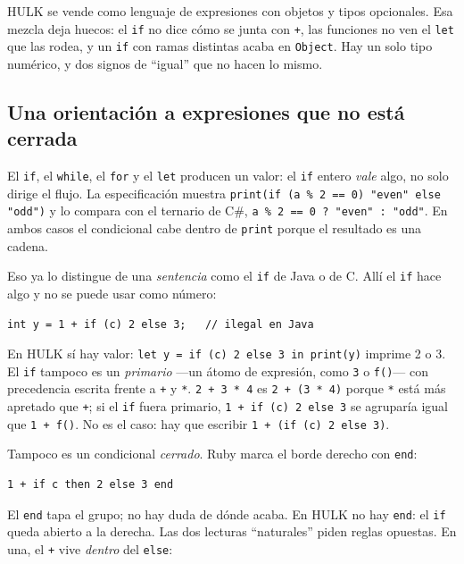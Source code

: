 \documentclass[11pt,a4paper]{article}
\begin{document}
HULK se vende como lenguaje de expresiones con objetos y tipos opcionales. Esa mezcla deja huecos: el \texttt{if} no dice cómo se junta con \texttt{+}, las funciones no ven el \texttt{let} que las rodea, y un \texttt{if} con ramas distintas acaba en \texttt{Object}. Hay un solo tipo numérico, y dos signos de ``igual'' que no hacen lo mismo.

\subsection{Una orientación a expresiones que no está cerrada}

El \texttt{if}, el \texttt{while}, el \texttt{for} y el \texttt{let} producen un valor: el \texttt{if} entero \emph{vale} algo, no solo dirige el flujo. La especificación muestra \texttt{print(if (a \% 2 == 0) "even" else "odd")} y lo compara con el ternario de C\#, \texttt{a \% 2 == 0 ? "even" : "odd"}. En ambos casos el condicional cabe dentro de \texttt{print} porque el resultado es una cadena.

Eso ya lo distingue de una \emph{sentencia} como el \texttt{if} de Java o de C. Allí el \texttt{if} hace algo y no se puede usar como número:

\begin{lstlisting}[language={},numbers=none]
int y = 1 + if (c) 2 else 3;   // ilegal en Java
\end{lstlisting}

En HULK sí hay valor: \texttt{let y = if (c) 2 else 3 in print(y)} imprime 2 o 3. El \texttt{if} tampoco es un \emph{primario} ---un átomo de expresión, como \texttt{3} o \texttt{f()}--- con precedencia escrita frente a \texttt{+} y \texttt{*}. \texttt{2 + 3 * 4} es \texttt{2 + (3 * 4)} porque \texttt{*} está más apretado que \texttt{+}; si el \texttt{if} fuera primario, \texttt{1 + if (c) 2 else 3} se agruparía igual que \texttt{1 + f()}. No es el caso: hay que escribir \texttt{1 + (if (c) 2 else 3)}.

Tampoco es un condicional \emph{cerrado}. Ruby marca el borde derecho con \texttt{end}:

\begin{lstlisting}[language={},numbers=none]
1 + if c then 2 else 3 end
\end{lstlisting}

El \texttt{end} tapa el grupo; no hay duda de dónde acaba. En HULK no hay \texttt{end}: el \texttt{if} queda abierto a la derecha. Las dos lecturas ``naturales'' piden reglas opuestas. En una, el \texttt{+} vive \emph{dentro} del \texttt{else}:
\end{document}
